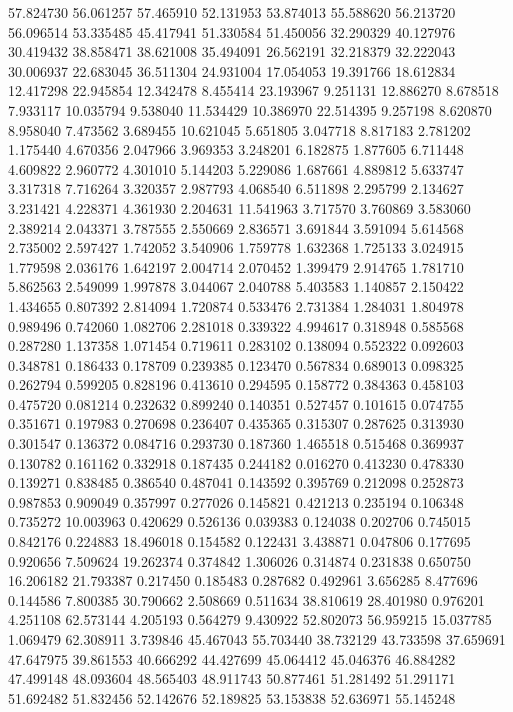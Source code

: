 57.824730
56.061257
57.465910
52.131953
53.874013
55.588620
56.213720
56.096514
53.335485
45.417941
51.330584
51.450056
32.290329
40.127976
30.419432
38.858471
38.621008
35.494091
26.562191
32.218379
32.222043
30.006937
22.683045
36.511304
24.931004
17.054053
19.391766
18.612834
12.417298
22.945854
12.342478
8.455414
23.193967
9.251131
12.886270
8.678518
7.933117
10.035794
9.538040
11.534429
10.386970
22.514395
9.257198
8.620870
8.958040
7.473562
3.689455
10.621045
5.651805
3.047718
8.817183
2.781202
1.175440
4.670356
2.047966
3.969353
3.248201
6.182875
1.877605
6.711448
4.609822
2.960772
4.301010
5.144203
5.229086
1.687661
4.889812
5.633747
3.317318
7.716264
3.320357
2.987793
4.068540
6.511898
2.295799
2.134627
3.231421
4.228371
4.361930
2.204631
11.541963
3.717570
3.760869
3.583060
2.389214
2.043371
3.787555
2.550669
2.836571
3.691844
3.591094
5.614568
2.735002
2.597427
1.742052
3.540906
1.759778
1.632368
1.725133
3.024915
1.779598
2.036176
1.642197
2.004714
2.070452
1.399479
2.914765
1.781710
5.862563
2.549099
1.997878
3.044067
2.040788
5.403583
1.140857
2.150422
1.434655
0.807392
2.814094
1.720874
0.533476
2.731384
1.284031
1.804978
0.989496
0.742060
1.082706
2.281018
0.339322
4.994617
0.318948
0.585568
0.287280
1.137358
1.071454
0.719611
0.283102
0.138094
0.552322
0.092603
0.348781
0.186433
0.178709
0.239385
0.123470
0.567834
0.689013
0.098325
0.262794
0.599205
0.828196
0.413610
0.294595
0.158772
0.384363
0.458103
0.475720
0.081214
0.232632
0.899240
0.140351
0.527457
0.101615
0.074755
0.351671
0.197983
0.270698
0.236407
0.435365
0.315307
0.287625
0.313930
0.301547
0.136372
0.084716
0.293730
0.187360
1.465518
0.515468
0.369937
0.130782
0.161162
0.332918
0.187435
0.244182
0.016270
0.413230
0.478330
0.139271
0.838485
0.386540
0.487041
0.143592
0.395769
0.212098
0.252873
0.987853
0.909049
0.357997
0.277026
0.145821
0.421213
0.235194
0.106348
0.735272
10.003963
0.420629
0.526136
0.039383
0.124038
0.202706
0.745015
0.842176
0.224883
18.496018
0.154582
0.122431
3.438871
0.047806
0.177695
0.920656
7.509624
19.262374
0.374842
1.306026
0.314874
0.231838
0.650750
16.206182
21.793387
0.217450
0.185483
0.287682
0.492961
3.656285
8.477696
0.144586
7.800385
30.790662
2.508669
0.511634
38.810619
28.401980
0.976201
4.251108
62.573144
4.205193
0.564279
9.430922
52.802073
56.959215
15.037785
1.069479
62.308911
3.739846
45.467043
55.703440
38.732129
43.733598
37.659691
47.647975
39.861553
40.666292
44.427699
45.064412
45.046376
46.884282
47.499148
48.093604
48.565403
48.911743
50.877461
51.281492
51.291171
51.692482
51.832456
52.142676
52.189825
53.153838
52.636971
55.145248
